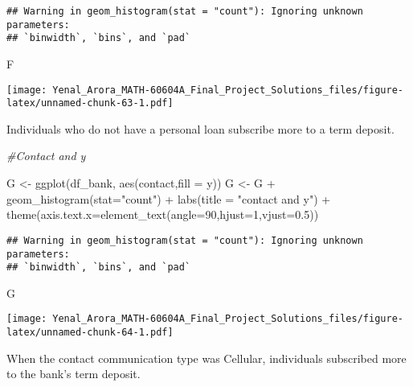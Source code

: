 \documentclass[
]{article}
\newenvironment{Shaded}{\begin{snugshade}}{\end{snugshade}}
\newcommand{\AttributeTok}[1]{\textcolor[rgb]{0.77,0.63,0.00}{#1}}
\newcommand{\CommentTok}[1]{\textcolor[rgb]{0.56,0.35,0.01}{\textit{#1}}}
\newcommand{\DecValTok}[1]{\textcolor[rgb]{0.00,0.00,0.81}{#1}}
\newcommand{\FloatTok}[1]{\textcolor[rgb]{0.00,0.00,0.81}{#1}}
\newcommand{\FunctionTok}[1]{\textcolor[rgb]{0.00,0.00,0.00}{#1}}
\newcommand{\NormalTok}[1]{#1}
\newcommand{\OtherTok}[1]{\textcolor[rgb]{0.56,0.35,0.01}{#1}}
\newcommand{\SpecialCharTok}[1]{\textcolor[rgb]{0.00,0.00,0.00}{#1}}
\newcommand{\StringTok}[1]{\textcolor[rgb]{0.31,0.60,0.02}{#1}}
\begin{document}
\begin{verbatim}
## Warning in geom_histogram(stat = "count"): Ignoring unknown parameters:
## `binwidth`, `bins`, and `pad`
\end{verbatim}

\begin{Shaded}
\begin{Highlighting}[]
\NormalTok{F}
\end{Highlighting}
\end{Shaded}

\texttt{[image: Yenal\_Arora\_MATH-60604A\_Final\_Project\_Solutions\_files/figure-latex/unnamed-chunk-63-1.pdf]}

Individuals who do not have a personal loan subscribe more to a term
deposit.

\begin{Shaded}
\begin{Highlighting}[]
\CommentTok{\#Contact and y}

\NormalTok{G }\OtherTok{\textless{}{-}} \FunctionTok{ggplot}\NormalTok{(df\_bank, }\FunctionTok{aes}\NormalTok{(contact,}\AttributeTok{fill =}\NormalTok{ y))}
\NormalTok{G }\OtherTok{\textless{}{-}}\NormalTok{ G }\SpecialCharTok{+} \FunctionTok{geom\_histogram}\NormalTok{(}\AttributeTok{stat=}\StringTok{"count"}\NormalTok{) }\SpecialCharTok{+} \FunctionTok{labs}\NormalTok{(}\AttributeTok{title =} \StringTok{"contact and y"}\NormalTok{) }\SpecialCharTok{+}
  \FunctionTok{theme}\NormalTok{(}\AttributeTok{axis.text.x=}\FunctionTok{element\_text}\NormalTok{(}\AttributeTok{angle=}\DecValTok{90}\NormalTok{,}\AttributeTok{hjust=}\DecValTok{1}\NormalTok{,}\AttributeTok{vjust=}\FloatTok{0.5}\NormalTok{))}
\end{Highlighting}
\end{Shaded}

\begin{verbatim}
## Warning in geom_histogram(stat = "count"): Ignoring unknown parameters:
## `binwidth`, `bins`, and `pad`
\end{verbatim}

\begin{Shaded}
\begin{Highlighting}[]
\NormalTok{G}
\end{Highlighting}
\end{Shaded}

\texttt{[image: Yenal\_Arora\_MATH-60604A\_Final\_Project\_Solutions\_files/figure-latex/unnamed-chunk-64-1.pdf]}

When the contact communication type was Cellular, individuals subscribed
more to the bank's term deposit.
\end{document}
